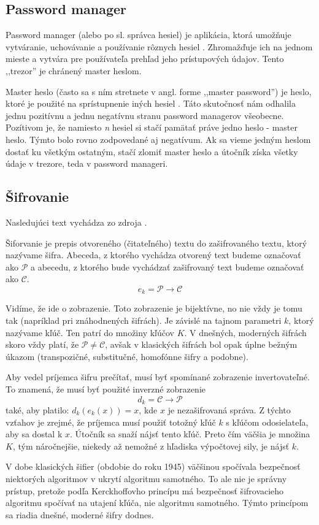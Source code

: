 \subsection{Password manager}
Password manager (alebo po sl. správca hesiel) je aplikácia, ktorá umožňuje vytváranie, uchovávanie a používanie rôznych hesiel \cite{6}. Zhromažďuje ich na jednom mieste a vytvára pre používateľa prehľad jeho prístupových údajov. Tento ,,trezor'' je chránený master heslom.
\par Master heslo (často sa s ním stretnete v angl. forme ,,master password'') je heslo, ktoré je použité na sprístupnenie iných hesiel \cite{7}. Táto skutočnosť nám odhalila jednu pozitívnu a jednu negatívnu stranu password managerov všeobecne. Pozítivom je, že namiesto \textit{n} hesiel si stačí pamätať práve jedno heslo - master heslo. Týmto bolo rovno zodpovedané aj negatívum. Ak sa vieme jedným heslom dostať ku všetkým ostatným, stačí zlomiť master heslo a útočník získa všetky údaje v trezore, teda v password manageri.

\subsection{Šifrovanie}
\noindent Nasledujúci text vychádza zo zdroja \cite{8}. 
\par Šiforvanie je prepis otvoreného (čitateľného) textu do zašifrovaného textu, ktorý nazývame šifra. Abeceda, z ktorého vychádza otvorený text budeme označovať ako $\mathcal{P}$ a abecedu, z ktorého bude vychádzať zašifrovaný text budeme označovať ako $\mathcal{C}$.
\begin{equation}
e_k = \mathcal{P} \rightarrow \mathcal{C}
\end{equation}
\par Vidíme, že ide o zobrazenie. Toto zobrazenie je bijektívne, no nie vždy je tomu tak (napríklad pri znáhodnených šifrách). Je závislé na tajnom parametri $k$, ktorý nazývame kľúč. Ten patrí do množiny kľúčov $K$. V dnešných, moderných šifrách skoro vždy platí, že $\mathcal{P} \neq \mathcal{C}$, avšak v klasických šifrách bol opak úplne bežným úkazom (transpozičné, substitučné, homofónne šifry a podobne).
\par Aby vedel príjemca šifru prečítať, musí byť spomínané zobrazenie invertovateľné. To znamená, že musí byť použité inverzné zobrazenie 
\begin{equation}
d_k = \mathcal{C} \rightarrow \mathcal{P}
\end{equation}
také, aby platilo: $d_k(e_k(x)) = x$, kde $x$ je nezašifrovaná správa. Z týchto vzťahov je zrejmé, že príjemca musí použiť totožný kľúč $k$ s kľúčom odosielateľa, aby sa dostal k $x$. Útočník sa snaží nájsť tento kľúč. Preto čím väčšia je množina $K$, tým náročnejšie, niekedy až nemožné z hľadiska výpočtovej sily, je nájsť $k$.
\par V dobe klasických šifier (obdobie do roku 1945) väčšinou spočívala bezpečnosť niektorých algoritmov v ukrytí algoritmu samotného. To ale nie je správny prístup, pretože podľa Kerckhoffovho princípu \cite{9} má bezpečnosť šifrovacieho algoritmu spočívať na utajení kľúča, nie algoritmu samotného. Týmto princípom sa riadia dnešné, moderné šifry dodnes. 

